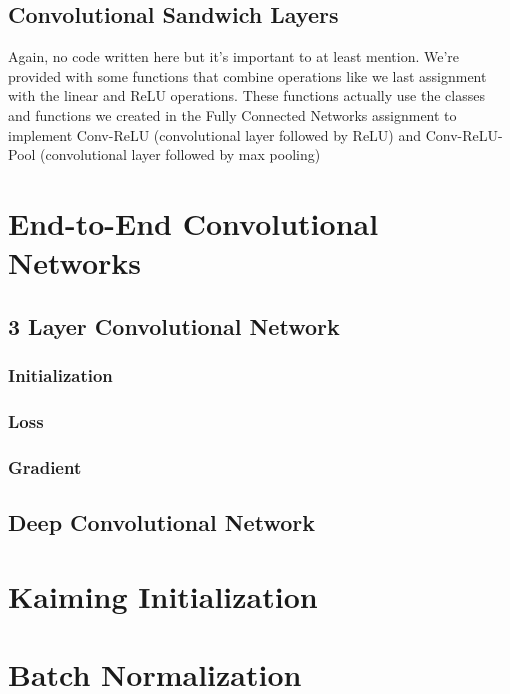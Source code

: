 \documentclass[12pt]{article}
\begin{document}
\subsection{Convolutional Sandwich Layers}
Again, no code written here but it's important to at least mention. We're provided with some functions 
that combine operations like we last assignment with the linear and ReLU operations. These functions 
actually use the classes and functions we created in the Fully Connected Networks assignment to 
implement Conv-ReLU (convolutional  layer followed by ReLU) and Conv-ReLU-Pool (convolutional 
layer followed by max pooling)


\section{End-to-End Convolutional Networks}

\subsection{3 Layer Convolutional Network}

\subsubsection{Initialization}

\subsubsection{Loss}

\subsubsection{Gradient}

\subsection{Deep Convolutional Network}

\section{Kaiming Initialization}

\section{Batch Normalization}
\end{document}
